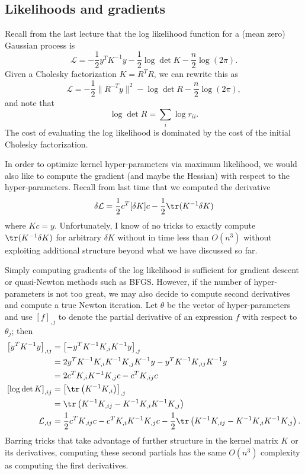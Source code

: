 \documentclass[12pt, leqno]{article} %
\begin{document}
\subsection{Likelihoods and gradients}

Recall from the last lecture that the log likelihood function for a
(mean zero) Gaussian process is
\[
\mathcal{L} =
  -\frac{1}{2} y^T K^{-1} y - \frac{1}{2} \log \det K - \frac{n}{2} \log(2\pi).
\]
Given a Cholesky factorization $K = R^T R$, we can rewrite this as
\[
\mathcal{L} =
  - \frac{1}{2} \|R^{-T} y\|^2 - \log \det R - \frac{n}{2} \log(2 \pi),
\]
and note that
\[
  \log \det R = \sum_{i} \log r_{ii}.
\]
The cost of evaluating the log likelihood is dominated by the cost of
the initial Cholesky factorization.

In order to optimize kernel hyper-parameters via maximum likelihood,
we would also like to compute the gradient (and maybe the Hessian)
with respect to the hyper-parameters.  Recall from last time that we
computed the derivative
\[
  \delta \mathcal{L} =
    \frac{1}{2} c^T [\delta K] c - \frac{1}{2} \tr(K^{-1} \delta K)
\]
where $Kc = y$.  Unfortunately, I know of no tricks to exactly compute
$\tr(K^{-1} \delta K)$ for arbitrary $\delta K$ without in time less than
$O(n^3)$ without exploiting additional structure beyond what we have
discussed so far.

Simply computing gradients of the log likelihood is sufficient for
gradient descent or quasi-Newton methods such as BFGS.  However,
if the number of hyper-parameters is not too great, we may also decide
to compute second derivatives and compute a true Newton iteration.
Let $\theta$ be the vector of hyper-parameters and use $[f]_{,j}$
to denote the partial derivative of an expression $f$ with respect
to $\theta_j$; then
\begin{align*}
  \left[ y^T K^{-1} y \right]_{,ij}
  &= \left[ -y^T K^{-1} K_{,i} K^{-1} y
     \right]_{,j} \\
  &= 2 y^T K^{-1} K_{,i} K^{-1} K_{,j} K^{-1} y-
       y^T K^{-1} K_{,ij} K^{-1} y \\
  &= 2 c^T K_{,i} K^{-1} K_{,j} c -
     c^T K_{,ij} c \\
  \left[ \log \det K \right]_{,ij}
  &= 
  \left[
    \tr\left( K^{-1} K_{,i} \right)
  \right]_{,j} \\
  &=
  \tr\left(
    K^{-1} K_{,ij} -
    K^{-1} K_{,i} K^{-1} K_{,j}
  \right) \\
  \mathcal{L}_{,ij}  
  &=
  \frac{1}{2} c^T K_{,ij} c - c^T K_{,i} K^{-1} K_{,j} c -
  \frac{1}{2} \tr\left( K^{-1} K_{,ij} - K^{-1} K_{,i} K^{-1} K_{,j} \right).
\end{align*}
Barring tricks that take advantage of further structure in the kernel
matrix $K$ or its derivatives, computing these second partials has the
same $O(n^3)$ complexity as computing the first derivatives.
\end{document}
